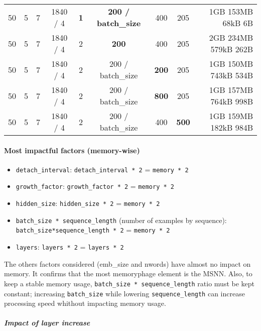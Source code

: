 {\begin{tabular}{|cccccccc|r|}
50 & 5 & 7 & 1840 / 4 & \textbf{1} & \textbf{200 / batch\_size} & 400 & 205 & 1GB 153MB 68kB 6B\\
50 & 5 & 7 & 1840 / 4 & 2 & \textbf{200} & 400 & 205 & 2GB 234MB 579kB 262B\\
50 & 5 & 7 & 1840 / 4 & 2 & 200 / batch\_size & \textbf{200} & 205 & 1GB 150MB 743kB 534B\\
50 & 5 & 7 & 1840 / 4 & 2 & 200 / batch\_size & \textbf{800} & 205 & 1GB 157MB 764kB 998B\\
50 & 5 & 7 & 1840 / 4 & 2 & 200 / batch\_size & 400 & \textbf{500} & 1GB 159MB 182kB 984B\\
\hline
\end{tabular}
}

\newpage
\paragraph{Most impactful factors
(memory-wise)}

\begin{itemize}
\item
  \lstinline!detach_interval!: \lstinline!detach_interval * 2! =
  \lstinline!memory * 2!
\item
  \lstinline!growth_factor!: \lstinline!growth_factor * 2! =
  \lstinline!memory * 2!
\item
  \lstinline!hidden_size!: \lstinline!hidden_size * 2! =
  \lstinline!memory * 2!
\item
  \lstinline!batch_size * sequence_length! (number of examples by
  sequence): \lstinline!batch_size*sequence_length * 2! =
  \lstinline!memory * 2!
\item
  \lstinline!layers!: \lstinline!layers * 2! = \lstinline!layers * 2!
\end{itemize}

The others factors considered (emb\_size and nwords) have almost no
impact on memory. It confirms that the most memoryphage element is the
MSNN. Also, to keep a stable memory usage,
\lstinline!batch_size * sequence_length! ratio must be kept constant;
increasing \lstinline!batch_size! while lowering
\lstinline!sequence_length! can increase processing speed whithout
impacting memory usage.

\subparagraph{Impact of layer increase}
\subparagraph*{}\vspace{-2em}{We can notice that the impacts of layers is most noticeable during the
first phases of training, during the creation of the first layer. Later
on, the creation frequency of new layers is small, and the change is
minimal. For example, from 6 to 7 layer, we need \(`12500`\) sequences
to pass, and the increase of memory of about \(`7/6`\); from 7 to 8
layer, we need \(`62500`\) sequences to pass, and the increase of memory
of about \(`8/7`\); from 8 to 9 layer, we need \(`312500`\) sequences to
pass, and the increase of memory of about \(`9/8`\); and so on.}

